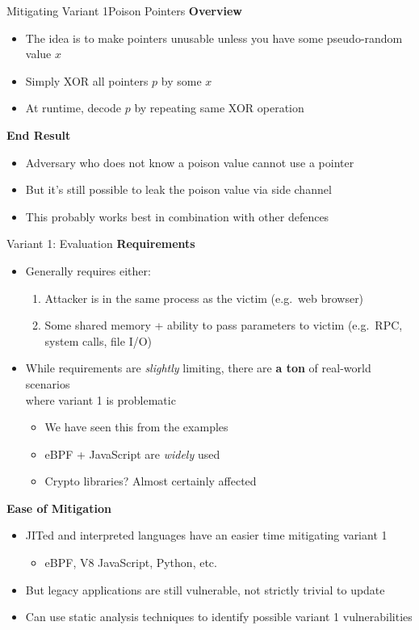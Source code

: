 \documentclass[10pt, dvipsnames, aspectratio=169]{beamer}
\begin{document}
\begin{frame}[c]{Mitigating Variant 1}{Poison Pointers}
  {\bf Overview}
  \begin{itemize}
    \item The idea is to make pointers unusable unless you have some pseudo-random value $x$
    \item Simply XOR all pointers $p$ by some $x$
    \item At runtime, decode $p$ by repeating same XOR operation
  \end{itemize}

  \vfill
  {\bf End Result}
  \begin{itemize}
    \item Adversary who does not know a poison value cannot use a pointer
    \item But it's still possible to leak the poison value via side channel
    \item This probably works best in combination with other defences
  \end{itemize}
\end{frame}

\begin{frame}[c, fragile]{Variant 1: Evaluation}{}
  {\bf Requirements}
  \begin{itemize}
    \item Generally requires either:
      \begin{enumerate}
        \item Attacker is in the same process as the victim (e.g.~web browser)
        \item Some shared memory + ability to pass parameters to victim (e.g.~RPC, system calls, file I/O)
      \end{enumerate}
    \item While requirements are \textit{slightly} limiting, there are {\bf a ton} of real-world scenarios\\
    where variant 1 is problematic
    \begin{itemize}
      \item We have seen this from the examples
      \item eBPF + JavaScript are \textit{widely} used
      \item Crypto libraries? Almost certainly affected
    \end{itemize}
  \end{itemize}

  \vfill
  {\bf Ease of Mitigation}
  \begin{itemize}
    \item JITed and interpreted languages have an easier time mitigating variant 1
    \begin{itemize}
      \item eBPF, V8 JavaScript, Python, etc.
    \end{itemize}
    \item But legacy applications are still vulnerable, not strictly trivial to update
    \item Can use static analysis techniques to identify possible variant 1 vulnerabilities
  \end{itemize}
\end{frame}
\end{document}
